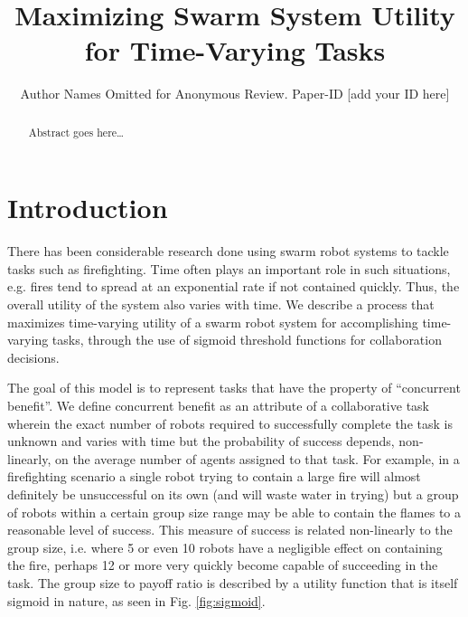 \documentclass[conference]{IEEETran}
\begin{document}
\title{Maximizing Swarm System Utility for Time-Varying Tasks}
\author{Author Names Omitted for Anonymous Review. Paper-ID [add your ID here]}

\maketitle

\begin{abstract}
Abstract goes here\ldots
\end{abstract}

\IEEEpeerreviewmaketitle

\section{Introduction}
There has been considerable research done using swarm robot systems to tackle tasks  such as firefighting. Time often plays an important role in such situations, e.g. fires tend to spread at an exponential rate if not contained quickly. Thus, the overall utility of the system also varies with time. We describe a process that maximizes time-varying utility of a swarm robot system for accomplishing time-varying tasks, through the use of sigmoid threshold functions for collaboration decisions.

The goal of this model is to represent tasks that have the property of ``concurrent benefit''. We define concurrent benefit as an attribute of a collaborative task wherein the exact number of robots required to successfully complete the task is unknown and varies with time but the probability of success depends, non-linearly, on the average number of agents assigned to that task. For example, in a firefighting scenario a single robot trying to contain a large fire will almost definitely be unsuccessful on its own (and will waste water in trying) but a group of robots within a certain group size range may be able to contain the flames to a reasonable level of success. This measure of success is related non-linearly to the group size, i.e. where 5 or even 10 robots have a negligible effect on containing the fire, perhaps 12 or more very quickly become capable of succeeding in the task. The group size to payoff ratio is described by a utility function that is itself sigmoid in nature, as seen in Fig. \ref{fig:sigmoid}.
\end{document}
